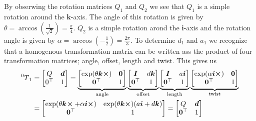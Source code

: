 \documentclass[a4paper]{scrartcl}
\begin{document}
\subsection{}
By obserwing the rotation matrices $Q_1$ and $Q_2$ we see that $Q_1$ is a simple rotation around the $\bm{k}$-axis. The angle of this rotation is given by $\theta = \arccos\left({\tfrac{1}{\sqrt{2}}}\right) = \frac{\pi}{4}$. $Q_2$ is a simple rotation arond the $\bm{i}$-axis and the rotation angle is given by $\alpha = \arccos{\left(-\frac{1}{2} \right)} = \frac{2\pi}{3}$. To determine $d_1$ and $a_1$ we recognize that a homogenous transformation matrix can be written ass the product of four transformation matrices; angle, offset, length and twist. This gives us
\begin{equation}\label{eq:2a}
    \begin{aligned}
        \prescript{0}{}{T}_1 &= \begin{bmatrix}
            Q & \bm{d} \\ 0^\top & 1
        \end{bmatrix} = 
        \underbrace{\begin{bmatrix}
            \exp(\theta \bm{k}\cross) & \bm{0} \\ \bm{0}^\top & 1 
        \end{bmatrix}}_{\text{angle}}
        \underbrace{\begin{bmatrix}
            \bm{I} & d \bm{k} \\ \bm{0}^\top & 1
        \end{bmatrix}}_{\text{offset}}
        \underbrace{\begin{bmatrix}
            \bm{I} & a \bm{i} \\ \bm{0}^\top & 1
        \end{bmatrix}}_{\text{length}}
        \underbrace{\begin{bmatrix}
            \exp(\alpha \bm{i}\cross) & \bm{0} \\ \bm{0}^\top & 1
        \end{bmatrix}}_{\text{twist}}\\
        &= \begin{bmatrix}
            \exp(\theta \bm{k}\!\cross + \alpha \bm{i}\cross) & \exp(\theta \bm{k}\cross)(a \bm{i} + d \bm{k}) \\
            \bm{0}^\top & 1
        \end{bmatrix} = 
        \begin{bmatrix}
            Q & \bm{d} \\ \bm{0}^\top & 1

\end{bmatrix}
\end{aligned}
\end{equation}
\end{document}
